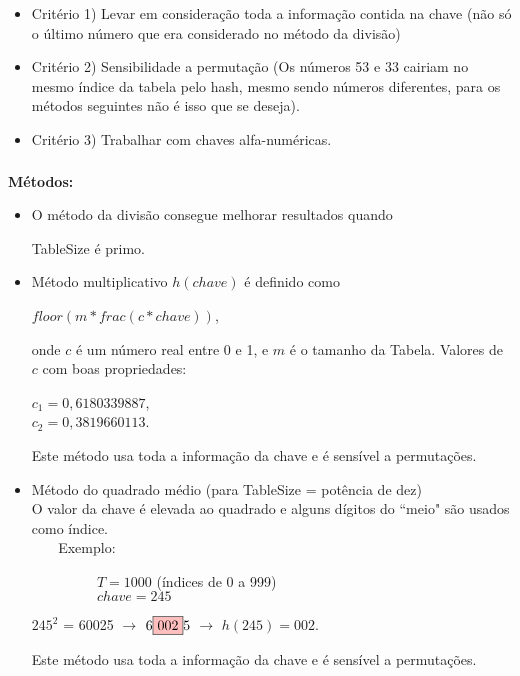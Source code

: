 \documentclass[a4paper, 12pt]{article}
\begin{document}
\begin{itemize}
\item Critério 1) Levar em consideração toda a informação contida na chave (não só o último número que era considerado no método da divisão)
\item Critério 2) Sensibilidade a permutação (Os números 53 e 33 cairiam no mesmo índice da tabela pelo hash, mesmo sendo números diferentes, para os métodos seguintes não é isso que se deseja).
\item Critério 3) Trabalhar com chaves alfa-numéricas.
\end{itemize}
\textcolor{white}{$\rightarrow$}
\\
\textbf{Métodos:}
\begin{itemize}
\item {} O método da divisão consegue melhorar resultados quando 

TableSize é primo.

\item {} Método multiplicativo $h(chave)$ é definido como 
\begin{center}
$floor(m * frac(c * chave))$,
\end{center}
onde $c$ é um número real entre 0 e 1, e $m$ é o tamanho da Tabela.
Valores de $c$ com boas propriedades:
\begin{center}
$c_{1} = 0,6180339887$,\\
$c_{2} = 0,3819660113$.\\
\end{center}
Este método usa toda a informação da chave e é sensível a permutações.
 
\pagebreak
\item {} Método do quadrado médio (para TableSize = potência de dez)\\
O valor da chave é elevada ao quadrado e alguns dígitos do ``meio" são usados como índice.\\
\textcolor{white}{$\rightarrow$} Exemplo:

\textcolor{white}{$\rightarrow \rightarrow \rightarrow$}$T = 1000$ (índices de 0 a 999)\\
\textcolor{white}{$\rightarrow \rightarrow \rightarrow$}$chave = 245$
\begin{center}
$245^2$ = 60025 $\rightarrow$ $6\fcolorbox{black}{pink}{002}5$ $\rightarrow$ $h(245) = 002$.
\end{center}
Este método usa toda a informação da chave e é sensível a permutações.


\end{itemize}
\end{document}
